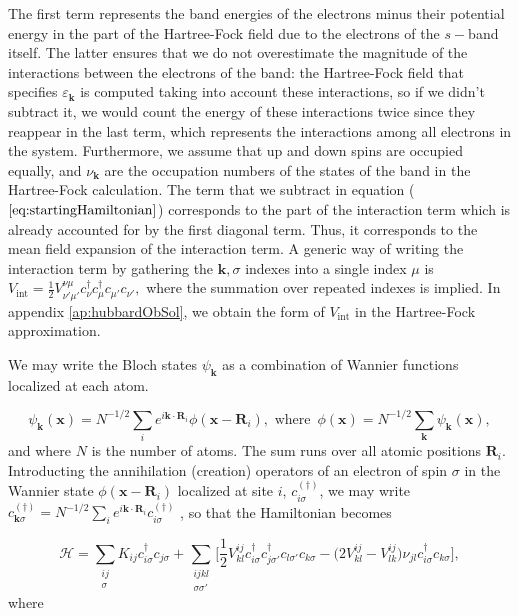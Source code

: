 The first term represents the band energies of the electrons minus their potential energy in the part of the Hartree-Fock field due to the electrons of the $s-$band itself.
The latter ensures that we do not overestimate the magnitude of the interactions between the electrons of the band: the Hartree-Fock field that specifies $\varepsilon_{\bm k}$ is computed taking into account these interactions, so if we didn't subtract it, we would count the energy of these interactions twice since they reappear in the last term, which  represents the interactions among all electrons in the system.
Furthermore, we assume that up and down spins are occupied equally, and $\nu_{\bm k}$ are the occupation numbers of the states of the band in the Hartree-Fock calculation. 
The term that we subtract in equation ($\ref{eq:startingHamiltonian}$) corresponds to the part of the interaction term which is already accounted for by the first diagonal  term.
Thus, it corresponds to the mean field expansion of the interaction term.
A generic way of writing the interaction term by gathering the $\bm k, \sigma$ indexes into a single index $\mu$ is $
V_{\text{int}} = \frac{1}{2} V^{\nu\mu}_{\nu'\mu'} c_\nu^\dagger c_\mu^\dagger c_{\mu'} c_{\nu'} ,
$
where the summation over repeated indexes is implied.
In appendix \ref{ap:hubbardObSol}, we obtain the form of $V_{\text{int}}$ in the Hartree-Fock approximation.

We may write the Bloch states $\psi_{\bm k}$ as a combination of Wannier functions localized at each atom.

\begin{equation}
\psi_{\bm k} (\bm x) = N^{-1/2} \sum_i e^{i \bm k \cdot \bm R_i} \phi (\bm x - \bm R_i), \,\, \text{where} \,\,\, \phi(\bm x) = N^{-1/2} \sum_{\bm k} \psi_{\bm k} (\bm x) , 
\end{equation}
and where $N$ is the number of atoms.
The sum runs over all atomic positions $\bm R_i$. 
Introducting the annihilation (creation) operators of an electron of spin $\sigma$ in the Wannier state $\phi (\bm x - \bm R_i)$ localized at site $i$, $c_{i\sigma}^{(\dagger)}$, we may write $
c_{\bm k \sigma}^{(\dagger)} = N^{-1/2} \sum_i e^{i \bm k \cdot \bm R_i} c_{i\sigma}^{(\dagger)}
$
, so that the Hamiltonian becomes 

\begin{equation}
\mathcal{H} = \sum_{\substack{ i j \\ \sigma} } K_{ij} c_{i \sigma}^\dagger c_{j \sigma} + \sum_{\substack{i j k l \\ \sigma \sigma'} } \bigg[  \frac{1}{2} V^{i j}_{k l}
 c_{i \sigma}^\dagger c_{j \sigma'}^\dagger c_{l \sigma'} c_{ k \sigma} - \bigg( 2 V^{i j}_{k l} - V^{i j} _{l k} \bigg) \nu_{j l} c_{i \sigma}^\dagger c_{ k \sigma} \bigg]  ,
\end{equation}
where

